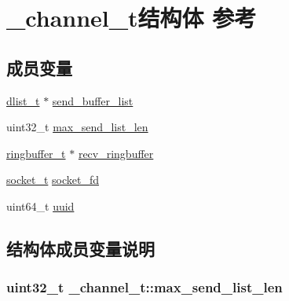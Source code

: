 \hypertarget{a00006}{}\section{\+\_\+channel\+\_\+t结构体 参考}
\label{a00006}
\subsection*{成员变量}
\begin{DoxyCompactItemize}
\item 
\hyperlink{a00050_ad6644d67df4b4e3596c1eb12977d1d16_ad6644d67df4b4e3596c1eb12977d1d16}{dlist\+\_\+t} $\ast$ \hyperlink{a00006_afb34664957775dd12ca46abfd8b640d2_afb34664957775dd12ca46abfd8b640d2}{send\+\_\+buffer\+\_\+list}
\item 
uint32\+\_\+t \hyperlink{a00006_a5508b5b3a6398c4ae99698a6f61284aa_a5508b5b3a6398c4ae99698a6f61284aa}{max\+\_\+send\+\_\+list\+\_\+len}
\item 
\hyperlink{a00050_af929c5cf86b6a0f64dde407dfe60482e_af929c5cf86b6a0f64dde407dfe60482e}{ringbuffer\+\_\+t} $\ast$ \hyperlink{a00006_aef08f14aa19b7df9255d93fced554200_aef08f14aa19b7df9255d93fced554200}{recv\+\_\+ringbuffer}
\item 
\hyperlink{a00050_a0d9e0afbf02fb6ed6c5b1415dce51b05_a0d9e0afbf02fb6ed6c5b1415dce51b05}{socket\+\_\+t} \hyperlink{a00006_a6bc972bd52fd95bada62bbd8afe65e1e_a6bc972bd52fd95bada62bbd8afe65e1e}{socket\+\_\+fd}
\item 
uint64\+\_\+t \hyperlink{a00006_a9bacff19ff16310a0b60c5d8a55924b6_a9bacff19ff16310a0b60c5d8a55924b6}{uuid}
\end{DoxyCompactItemize}


\subsection{结构体成员变量说明}
\hypertarget{a00006_a5508b5b3a6398c4ae99698a6f61284aa_a5508b5b3a6398c4ae99698a6f61284aa}{}
\subsubsection[{max\+\_\+send\+\_\+list\+\_\+len}]{\setlength{\rightskip}{0pt plus 5cm}uint32\+\_\+t \+\_\+channel\+\_\+t\+::max\+\_\+send\+\_\+list\+\_\+len}\label{a00006_a5508b5b3a6398c4ae99698a6f61284aa_a5508b5b3a6398c4ae99698a6f61284aa}
\hypertarget{a00006_aef08f14aa19b7df9255d93fced554200_aef08f14aa19b7df9255d93fced554200}{}
